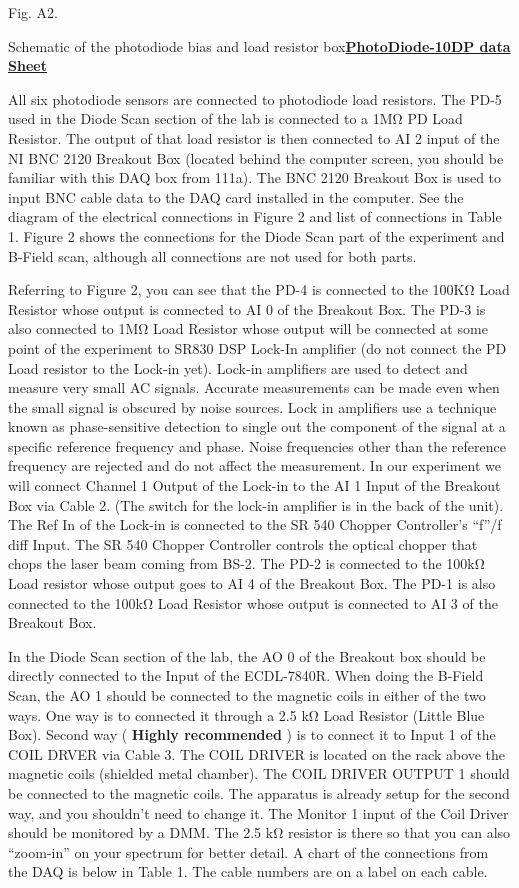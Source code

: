 \documentclass{../lab}
\begin{document}
 Fig. A2.

Schematic of the photodiode bias and load resistor box\href{http://experimentationlab.berkeley.edu/sites/default/files/images/PhotoDiode-10DP.pdf}{\textbf{PhotoDiode-10DP data Sheet}}

All six photodiode sensors are connected to photodiode load resistors. The PD-5 used in the Diode Scan section of the lab is connected to a 1MΩ PD Load Resistor. The output of that load resistor is then connected to AI 2 input of the NI BNC 2120 Breakout Box (located behind the computer screen, you should be familiar with this DAQ box from 111a). The BNC 2120 Breakout Box is used to input BNC cable data to the DAQ card installed in the computer. See the diagram of the electrical connections in Figure 2 and list of connections in Table 1. Figure 2 shows the connections for the Diode Scan part of the experiment and B-Field scan, although all connections are not used for both parts.

Referring to Figure 2, you can see that the PD-4 is connected to the 100KΩ Load Resistor whose output is connected to AI 0 of the Breakout Box. The PD-3 is also connected to 1MΩ Load Resistor whose output will be connected at some point of the experiment to SR830 DSP Lock-In amplifier (do not connect the PD Load resistor to the Lock-in yet). Lock-in amplifiers are used to detect and measure very small AC signals. Accurate measurements can be made even when the small signal is obscured by noise sources. Lock in amplifiers use a technique known as phase-sensitive detection to single out the component of the signal at a specific reference frequency and phase. Noise frequencies other than the reference frequency are rejected and do not affect the measurement. In our experiment we will connect Channel 1 Output of the Lock-in to the AI 1 Input of the Breakout Box via Cable 2. (The switch for the lock-in amplifier is in the back of the unit). The Ref In of the Lock-in is connected to the SR 540 Chopper Controller's ``f''/f diff Input. The SR 540 Chopper Controller controls the optical chopper that chops the laser beam coming from BS-2. The PD-2 is connected to the 100kΩ Load resistor whose output goes to AI 4 of the Breakout Box. The PD-1 is also connected to the 100kΩ Load Resistor whose output is connected to AI 3 of the Breakout Box.

In the Diode Scan section of the lab, the AO 0 of the Breakout box should be directly connected to the Input of the ECDL-7840R. When doing the B-Field Scan, the AO 1 should be connected to the magnetic coils in either of the two ways. One way is to connected it through a 2.5 kΩ Load Resistor (Little Blue Box). Second way (\textbf{ Highly recommended }) is to connect it to Input 1 of the COIL DRVER via Cable 3. The COIL DRIVER is located on the rack above the magnetic coils (shielded metal chamber). The COIL DRIVER OUTPUT 1 should be connected to the magnetic coils. The apparatus is already setup for the second way, and you shouldn't need to change it. The Monitor 1 input of the Coil Driver should be monitored by a DMM. The 2.5 kΩ resistor is there so that you can also ``zoom-in'' on your spectrum for better detail. A chart of the connections from the DAQ is below in Table 1. The cable numbers are on a label on each cable.
\end{document}
